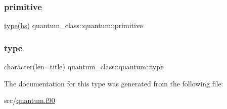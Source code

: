 \mbox{\label{structquantum__class_1_1quantum_a285ebdf853c486f65ce55d6f45e65720}} 
\subsubsection{\texorpdfstring{primitive}{primitive}}
{\footnotesize\ttfamily \hyperlink{structquantum__class_1_1quantum_aa222a9bd02a7dd3f8b37cdbcd33a6d74}{type}(\hyperlink{strucths__class_1_1hs}{hs}) quantum\+\_\+class\+::quantum\+::primitive\hspace{0.3cm}{\ttfamily [private]}}

\mbox{\label{structquantum__class_1_1quantum_aa222a9bd02a7dd3f8b37cdbcd33a6d74}} 
\subsubsection{\texorpdfstring{type}{type}}
{\footnotesize\ttfamily character(len=title) quantum\+\_\+class\+::quantum\+::type\hspace{0.3cm}{\ttfamily [private]}}



The documentation for this type was generated from the following file\+:\begin{DoxyCompactItemize}
\item 
src/\hyperlink{quantum_8f90}{quantum.\+f90}\end{DoxyCompactItemize}
